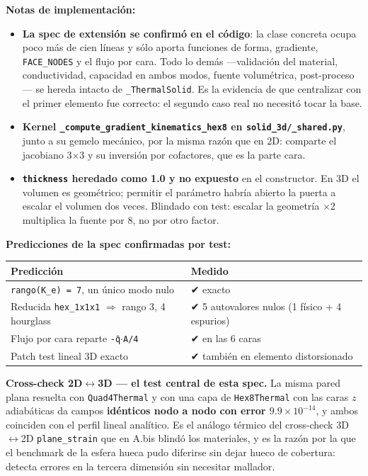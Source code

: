 \documentclass[11pt,letterpaper,oneside]{report}
\begin{document}
\textbf{Notas de implementación:}

\begin{itemize}
  \item \textbf{La spec de extensión se confirmó en el código}: la clase concreta ocupa poco más de cien líneas y sólo aporta funciones de forma, gradiente, \texttt{FACE\_NODES} y el flujo por cara. Todo lo demás ---validación del material, conductividad, capacidad en ambos modos, fuente volumétrica, post-proceso--- se hereda intacto de \texttt{\_ThermalSolid}. Es la evidencia de que centralizar con el primer elemento fue correcto: el segundo caso real no necesitó tocar la base.
\end{itemize}

\begin{itemize}
  \item \textbf{Kernel \texttt{\_compute\_gradient\_kinematics\_hex8} en \texttt{solid\_3d/\_shared.py}}, junto a su gemelo mecánico, por la misma razón que en 2D: comparte el jacobiano 3\ensuremath{\times}3 y su inversión por cofactores, que es la parte cara.
\end{itemize}

\begin{itemize}
  \item \textbf{\texttt{thickness} heredado como 1.0 y no expuesto} en el constructor. En 3D el volumen es geométrico; permitir el parámetro habría abierto la puerta a escalar el volumen dos veces. Blindado con test: escalar la geometría \ensuremath{\times}2 multiplica la fuente por 8, no por otro factor.
\end{itemize}

\textbf{Predicciones de la spec confirmadas por test:}

\begin{center}
\begin{tabularx}{\textwidth}{YY}
\hline
\textbf{Predicción} & \textbf{Medido} \\
\hline
\texttt{rango(K\_e) = 7}, un único modo nulo & ✔ exacto \\
Reducida \texttt{hex\_1x1x1} \ensuremath{\Rightarrow} rango 3, 4 hourglass & ✔ 5 autovalores nulos (1 físico + 4 espurios) \\
Flujo por cara reparte \texttt{-q̄\ensuremath{\cdot}A/4} & ✔ en las 6 caras \\
Patch test lineal 3D exacto & ✔ también en elemento distorsionado \\
\hline
\end{tabularx}
\end{center}
\textbf{Cross-check 2D\ensuremath{\leftrightarrow}3D --- el test central de esta spec.} La misma pared plana resuelta con \texttt{Quad4Thermal} y con una capa de \texttt{Hex8Thermal} con las caras $z$ adiabáticas da campos \textbf{idénticos nodo a nodo con error $9.9\times10^{-14}$}, y ambos coinciden con el perfil lineal analítico. Es el análogo térmico del cross-check 3D\ensuremath{\leftrightarrow}2D \texttt{plane\_strain} que en A.bis blindó los materiales, y es la razón por la que el benchmark de la esfera hueca pudo diferirse sin dejar hueco de cobertura: detecta errores en la tercera dimensión sin necesitar mallador.
\end{document}
